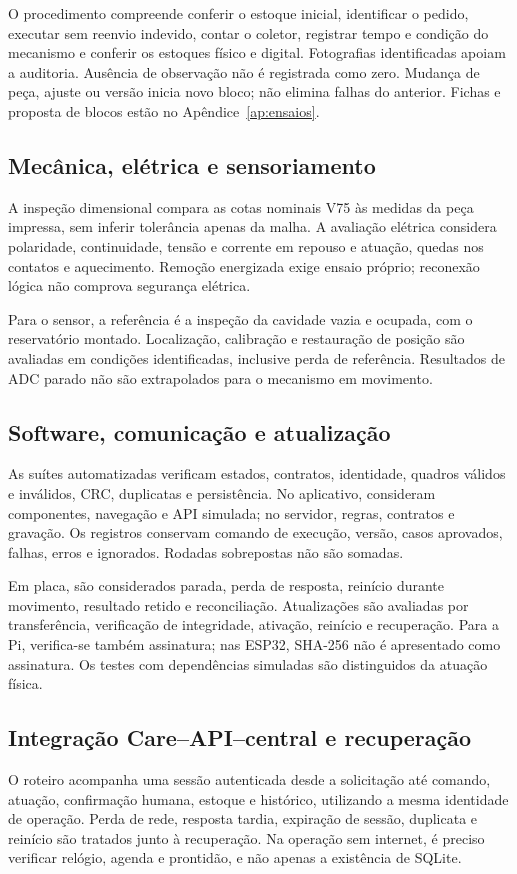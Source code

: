 O procedimento compreende conferir o estoque inicial, identificar o pedido, executar sem reenvio indevido, contar o coletor, registrar tempo e condição do mecanismo e conferir os estoques físico e digital. Fotografias identificadas apoiam a auditoria. Ausência de observação não é registrada como zero. Mudança de peça, ajuste ou versão inicia novo bloco; não elimina falhas do anterior. Fichas e proposta de blocos estão no Apêndice~\ref{ap:ensaios}.

\subsection{Mecânica, elétrica e sensoriamento}
A inspeção dimensional compara as cotas nominais V75 às medidas da peça impressa, sem inferir tolerância apenas da malha. A avaliação elétrica considera polaridade, continuidade, tensão e corrente em repouso e atuação, quedas nos contatos e aquecimento. Remoção energizada exige ensaio próprio; reconexão lógica não comprova segurança elétrica.

Para o sensor, a referência é a inspeção da cavidade vazia e ocupada, com o reservatório montado. Localização, calibração e restauração de posição são avaliadas em condições identificadas, inclusive perda de referência. Resultados de ADC parado não são extrapolados para o mecanismo em movimento.

\subsection{Software, comunicação e atualização}
As suítes automatizadas verificam estados, contratos, identidade, quadros válidos e inválidos, CRC, duplicatas e persistência. No aplicativo, consideram componentes, navegação e API simulada; no servidor, regras, contratos e gravação. Os registros conservam comando de execução, versão, casos aprovados, falhas, erros e ignorados. Rodadas sobrepostas não são somadas.

Em placa, são considerados parada, perda de resposta, reinício durante movimento, resultado retido e reconciliação. Atualizações são avaliadas por transferência, verificação de integridade, ativação, reinício e recuperação. Para a Pi, verifica-se também assinatura; nas ESP32, SHA-256 não é apresentado como assinatura. Os testes com dependências simuladas são distinguidos da atuação física.

\subsection{Integração Care--API--central e recuperação}
O roteiro acompanha uma sessão autenticada desde a solicitação até comando, atuação, confirmação humana, estoque e histórico, utilizando a mesma identidade de operação. Perda de rede, resposta tardia, expiração de sessão, duplicata e reinício são tratados junto à recuperação. Na operação sem internet, é preciso verificar relógio, agenda e prontidão, e não apenas a existência de SQLite.

